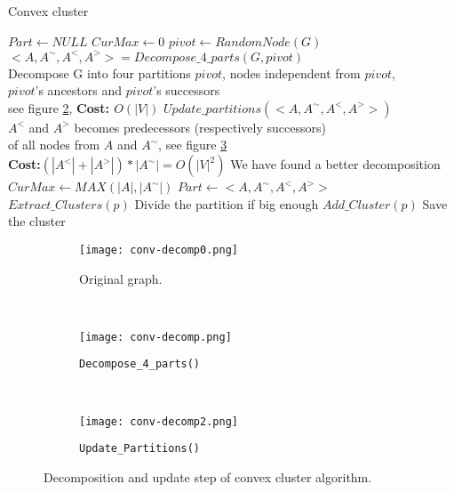 \documentclass[10pt, conference, compsocconf,pdftex,dvipsnames]{IEEEtran}
\begin{document}
\begin{algorithm}[htb]
    \centering
    \caption{Convex cluster}
    \label{algo:conv-clust}
    \begin{algorithmic}[1]
        \State $Part \gets NULL$
        \State $CurMax \gets 0$
        \label{algop:main-loop}
        \State $pivot \gets RandomNode(G)$
        \State
        $<A,A^{\sim},A^<,A^>>=Decompose\_4\_parts(G,pivot)$\\\label{algop:init-part}
        \Comment Decompose G into four partitions $pivot$, nodes independent from $pivot$,\\ 
        \Comment $pivot$'s ancestors and $pivot$'s successors\\
        \Comment see figure \ref{fig:conv-decomp1}, \textbf{Cost: $O(|V|)$}
        \State $Update\_partitions(<A,A^{\sim},A^<,A^>>)$
        \\\label{algop:update-part}
        \Comment $A^<$ and $A^>$ becomes predecessors  (respectively successors)\\
        \Comment of all nodes from $A$ and $A^{\sim}$, see figure \ref{fig:conv-decomp2} \\
        \Comment \textbf{Cost:$(|A^<| +
        |A^>| )*|A^{\sim}| = O(|V|^2)$}
         \label{algop:part-choice}
        \Comment We have found a better decomposition
        \State $CurMax \gets MAX(|A|,|A^{\sim}|)$
        \State $Part \gets <A,A^{\sim},A^<,A^>>$
        \EndIf
        \EndFor
        \label{algop:rec-stop}
        \State $Extract\_Clusters(p)$
        \Comment Divide the partition if big enough
        \Else
        \State $Add\_Cluster(p)$
        \Comment Save the cluster
        \EndIf
        \EndFor
        \EndFunction
    \end{algorithmic}
\end{algorithm}

\begin{figure*}[tb]
    \centering
    \begin{subfigure}{0.24\textwidth}
        \centering
        \texttt{[image: conv-decomp0.png]}
        \caption{Original graph.}
        \label{fig:conv-decomp0}
    \end{subfigure}
    ~
    \begin{subfigure}{0.27\textwidth}
        \centering
        \texttt{[image: conv-decomp.png]}
        \caption{\texttt{Decompose\_4\_parts()}}
        \label{fig:conv-decomp1}
    \end{subfigure}
    ~
    \begin{subfigure}{0.27\textwidth}
        \centering
        \texttt{[image: conv-decomp2.png]}
        \caption{\texttt{Update\_Partitions()}}
        \label{fig:conv-decomp2}
    \end{subfigure}
    \caption{Decomposition and update step of convex cluster algorithm.}
    \label{fig:conv-decomp}
\end{figure*}
\end{document}
